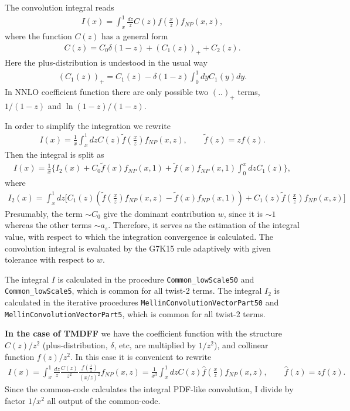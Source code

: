 \documentclass[prd,nofootinbib,eqsecnum,final]{revtex4}
\renewcommand{\(}{\left(}
\renewcommand{\)}{\right)}
\renewcommand{\[}{\left[}
\renewcommand{\]}{\right]}
\begin{document}
The convolution integral reads
\begin{eqnarray}
I(x)=\int_x^1 \frac{dz}{z}C(z)f\(\frac{x}{z}\)f_{NP}(x,z),
\end{eqnarray}
where the function $C(z)$ has a general form
\begin{eqnarray}
C(z)=C_0 \delta(1-z)+\(C_1(z)\)_++C_2(z).
\end{eqnarray}
Here the plus-distribution is undestood in the usual way
\begin{eqnarray}
\(C_1(z)\)_+=C_1(z)-\delta(1-z)\int_0^1 dy C_1(y)dy.
\end{eqnarray}
In NNLO coefficient function there are only possible two $(..)_+$ terms, $1/(1-z)$ and $\ln(1-z)/(1-z)$.

In order to simplify the integration we rewrite
\begin{eqnarray}
I(x)=\frac{1}{x}\int_x^1 dz C(z)\tilde f\(\frac{x}{z}\)f_{NP}(x,z),\qquad \tilde f(z)=zf(z).
\end{eqnarray}
Then the integral is split as
\begin{eqnarray}
I(x)=\frac{1}{x}\Big\{I_2(x)+C_0\tilde f\(x\)f_{NP}(x,1)+\tilde f\(x\)f_{NP}(x,1)\int_0^x dz C_1(z)\Big\},
\end{eqnarray}
where
\begin{eqnarray}
I_2(x)=\int_x^1 dz \Big[C_1(z)\(\tilde f\(\frac{x}{z}\)f_{NP}(x,z)-\tilde f\(x\)f_{NP}(x,1)\)+C_1(z)\tilde f\(\frac{x}{z}\)f_{NP}(x,z)\Big]
\end{eqnarray}
Presumably, the term $\sim C_0$ give the dominant contribution $w$, since it is $\sim 1$ whereas the other terms $\sim a_s$. Therefore, it serves as the estimation of the integral value, with respect to which the integration convergence is calculated. The convolution integral is evaluated by the G7K15 rule adaptively with given tolerance with respect to $w$. 

The integral $I$ is calculated in the procedure \texttt{Common\_lowScale50} and \texttt{Common\_lowScale5}, which is common for all twist-2 terms. The integral $I_2$ is calculated in the iterative procedures \texttt{MellinConvolutionVectorPart50} and \texttt{MellinConvolutionVectorPart5}, which is common for all twist-2 terms. 

\textbf{In the case of TMDFF} we have the coefficient function with the structure $C(z)/z^2$ (plus-distribution, $\delta$, etc, are multiplied by $1/z^2$), and collinear function $f(z)/z^2$. In this case it is convenient to rewrite
\begin{eqnarray}
I(x)=\int_x^1 \frac{dz}{z}\frac{C(z)}{z^2}\frac{f\(\frac{x}{z}\)}{(x/z)^2}f_{NP}(x,z)=\frac{1}{x^3}\int_x^1 dz C(z)\hat f\(\frac{x}{z}\)f_{NP}(x,z),\qquad \hat f(z)=zf(z).
\end{eqnarray}
Since the common-code calculates the integral PDF-like convolution, I divide by factor $1/x^2$ all output of the common-code.
\end{document}
